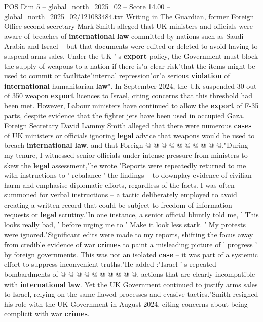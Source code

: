 \begin{textsample}{POS Dim 5 – global\_north\_2025\_02 – Score 14.00 – global\_north\_2025\_02/121083484.txt}  \label{ex:f5_pos_335}
Writing in The Guardian, former Foreign Office second secretary Mark Smith alleged that UK ministers and officials were aware of breaches of \textbf{international} \textbf{law} committed by nations such as Saudi Arabia and Israel -- but that documents were edited or deleted to avoid having to suspend arms sales.
Under the UK ' s \textbf{export} policy, the Government must block the supply of weapons to a nation if there is"a clear risk"that the items might be used to commit or facilitate"internal repression"or"a serious \textbf{violation} of \textbf{international} humanitarian \textbf{law}".
In September 2024, the UK suspended 30 out of 350 weapon \textbf{export} licences to Israel, citing concerns that this threshold had been met.
However, Labour ministers have continued to allow the \textbf{export} of F-35 parts, despite evidence that the fighter jets have been used in occupied Gaza.
Foreign Secretary David Lammy Smith alleged that there were numerous \textbf{cases} of UK ministers or officials ignoring \textbf{legal} advice that weapons would be used to breach \textbf{international} \textbf{law}, and that Foreign @ @ @ @ @ @ @ @ @ @."During my tenure, I witnessed senior officials under intense pressure from ministers to skew the \textbf{legal} assessment,"he wrote."Reports were repeatedly returned to me with instructions to ' rebalance ' the findings -- to downplay evidence of civilian harm and emphasise diplomatic efforts, regardless of the facts.
I was often summoned for verbal instructions -- a tactic deliberately employed to avoid creating a written record that could be subject to freedom of information requests or \textbf{legal} scrutiny."In one instance, a senior official bluntly told me, ' This looks really bad, ' before urging me to ' Make it look less stark. ' My protests were ignored."Significant edits were made to my reports, shifting the focus away from credible evidence of war \textbf{crimes} to paint a misleading picture of ' progress ' by foreign governments.
This was not an isolated \textbf{case} -- it was part of a systemic effort to suppress inconvenient truths."He added :"Israel ' s repeated bombardments of @ @ @ @ @ @ @ @ @ @, actions that are clearly incompatible with \textbf{international} \textbf{law}.
Yet the UK Government continued to justify arms sales to Israel, relying on the same flawed processes and evasive tactics."Smith resigned his role with the UK Government in August 2024, citing concerns about being complicit with war \textbf{crimes}.

\end{textsample}
